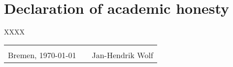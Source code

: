 \documentclass[12pt,numbers=noenddot,parskip,bibliography=totocnumbered,listof=totocnumbered]{scrreprt}
\begin{document}
\clearpage
{}



\listoffigures

\chapter*{Declaration of academic honesty}
\thispagestyle{empty}
XXXX
\begin{center}
\begin{tabular}{lp{2em}l} 
 \hspace{5cm}   && \hspace{4cm} \\\cline{1-1}\cline{3-3} 
 Bremen, \today    && Jan-Hendrik Wolf 
\end{tabular} 
\end{center}
\end{document}
